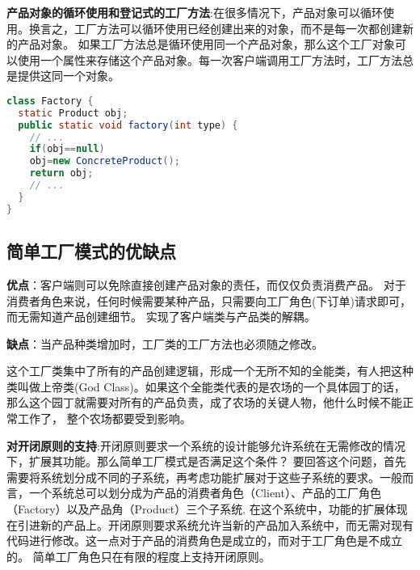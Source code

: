 \documentclass[../main.tex]{subfiles}
\begin{document}
\textbf{产品对象的循环使用和登记式的工厂方法}:在很多情况下，产品对象可以循环使用。换言之，工厂方法可以循环使用已经创建出来的对象，而不是每一次都创建新的产品对象。
如果工厂方法总是循环使用同一个产品对象，那么这个工厂对象可以使用一个属性来存储这个产品对象。每一次客户端调用工厂方法时，工厂方法总是提供这同一个对象。
\begin{lstlisting}[language=java]
class Factory {
  static Product obj;
  public static void factory(int type) {
    // ...
    if(obj==null)
    obj=new ConcreteProduct();
    return obj;
    // ...
  }
}
\end{lstlisting}
%
\subsection{简单工厂模式的优缺点}
\textbf{优点}：客户端则可以免除直接创建产品对象的责任，而仅仅负责消费产品。
对于消费者角色来说，任何时候需要某种产品，只需要向工厂角色(下订单)请求即可，而无需知道产品创建细节。
实现了客户端类与产品类的解耦。

\textbf{缺点}：当产品种类增加时，工厂类的工厂方法也必须随之修改。

这个工厂类集中了所有的产品创建逻辑，形成一个无所不知的全能类，有人把这种类叫做上帝类(God Class)。如果这个全能类代表的是农场的一个具体园丁的话，那么这个园丁就需要对所有的产品负责，成了农场的关键人物，他什么时候不能正常工作了， 整个农场都要受到影响。

\noindent \textbf{对开闭原则的支持}:开闭原则要求一个系统的设计能够允许系统在无需修改的情况下，扩展其功能。那么简单工厂模式是否满足这个条件？
要回答这个问题，首先需要将系统划分成不同的子系统，再考虑功能扩展对于这些子系统的要求。一般而言，一个系统总可以划分成为产品的消费者角色（Client）、产品的工厂角色（Factory）以及产品角（Product）三个子系统.
在这个系统中，功能的扩展体现在引进新的产品上。开闭原则要求系统允许当新的产品加入系统中，而无需对现有代码进行修改。这一点对于产品的消费角色是成立的，而对于工厂角色是不成立的。
简单工厂角色只在有限的程度上支持开闭原则。
\end{document}
